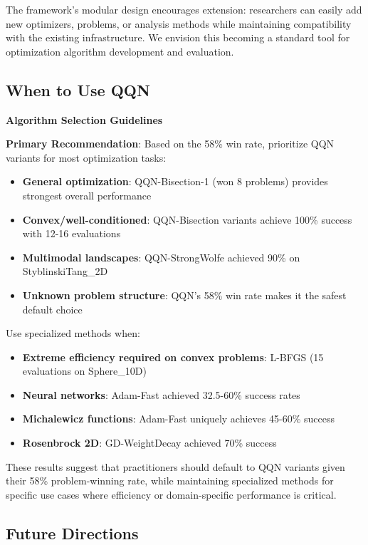 The framework's modular design encourages extension: researchers can easily add new optimizers, problems, or analysis methods while maintaining compatibility with the existing infrastructure. We envision this becoming a standard tool for optimization algorithm development and evaluation.

\hypertarget{when-to-use-qqn}{%
\subsection{When to Use QQN}\label{when-to-use-qqn}}

\textbf{Algorithm Selection Guidelines}

\textbf{Primary Recommendation}: Based on the 58\% win rate, prioritize QQN variants for most optimization tasks:

\begin{itemize}
\tightlist
\item
  \textbf{General optimization}: QQN-Bisection-1 (won 8 problems) provides strongest overall performance
\item
  \textbf{Convex/well-conditioned}: QQN-Bisection variants achieve 100\% success with 12-16 evaluations
\item
  \textbf{Multimodal landscapes}: QQN-StrongWolfe achieved 90\% on StyblinskiTang\_2D
\item
  \textbf{Unknown problem structure}: QQN's 58\% win rate makes it the safest default choice
\end{itemize}

Use specialized methods when:

\begin{itemize}
\tightlist
\item
  \textbf{Extreme efficiency required on convex problems}: L-BFGS (15 evaluations on Sphere\_10D)
\item
  \textbf{Neural networks}: Adam-Fast achieved 32.5-60\% success rates
\item
  \textbf{Michalewicz functions}: Adam-Fast uniquely achieves 45-60\% success
\item
  \textbf{Rosenbrock 2D}: GD-WeightDecay achieved 70\% success
\end{itemize}

These results suggest that practitioners should default to QQN variants given their 58\% problem-winning rate, while maintaining specialized methods for specific use cases where efficiency or domain-specific performance is critical.

\hypertarget{future-directions}{%
\subsection{Future Directions}\label{future-directions}}

